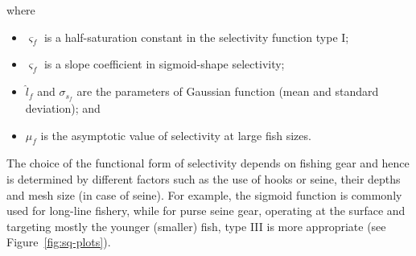\noindent where
\begin{itemize}
\item $\varsigma_f$ is a half-saturation constant in the selectivity function type I;
\item $\varsigma_f$ is a slope coefficient in sigmoid-shape selectivity;
\item $\hat{l}_f$ and $\sigma_{s_f}$ are the parameters of Gaussian function (mean and standard deviation); and
\item $\mu_f$ is the asymptotic value of selectivity at large fish sizes.
\end{itemize}

\noindent The choice of the functional form of selectivity depends on fishing gear and hence is determined by different factors such as the use of hooks or seine, their depths and mesh size (in case of seine). For example, the sigmoid function is commonly used for long-line fishery, while for purse seine gear, operating at the surface and targeting mostly the younger (smaller) fish, type III is more appropriate (see Figure~\ref{fig:sq-plots}).  


